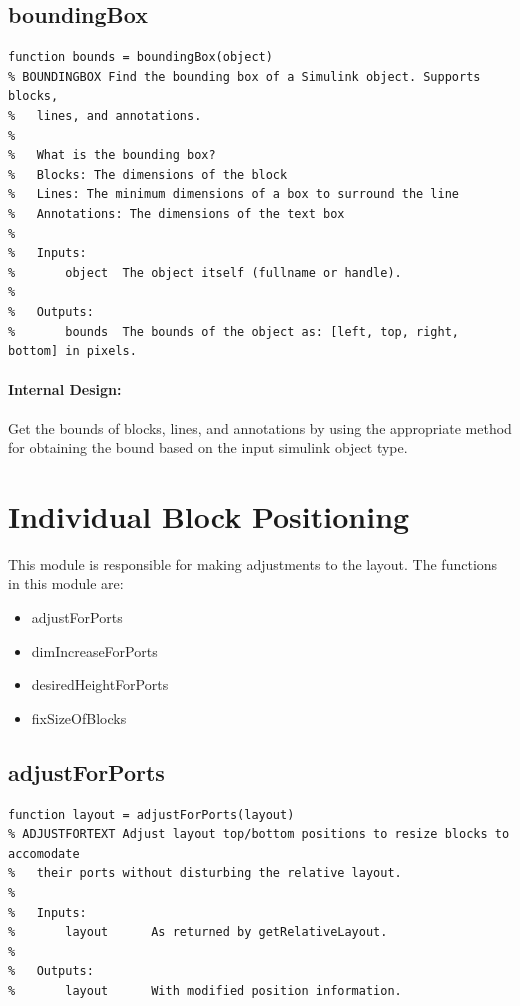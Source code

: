 \documentclass[12pt,letterpaper]{report}
\begin{document}

\subsection{boundingBox} \label{boundingBox}
\begin{lstlisting}
function bounds = boundingBox(object)
% BOUNDINGBOX Find the bounding box of a Simulink object. Supports blocks,
%   lines, and annotations.
%
%   What is the bounding box?
%   Blocks: The dimensions of the block
%   Lines: The minimum dimensions of a box to surround the line
%   Annotations: The dimensions of the text box
%
%   Inputs:
%       object  The object itself (fullname or handle).
%
%   Outputs:
%       bounds  The bounds of the object as: [left, top, right, bottom] in pixels.
\end{lstlisting}
\paragraph{Internal Design:} Get the bounds of blocks, lines, and annotations by using the appropriate method for obtaining the bound based on the input simulink object type.

\section{Individual Block Positioning}
\par This module is responsible for making adjustments to the layout. The functions in this module are:
\begin{itemize}
	\item adjustForPorts
	\item dimIncreaseForPorts
	\item desiredHeightForPorts
	\item fixSizeOfBlocks
\end{itemize}

\subsection{adjustForPorts} \label{adjustForPorts}
\begin{lstlisting}
function layout = adjustForPorts(layout)
% ADJUSTFORTEXT Adjust layout top/bottom positions to resize blocks to accomodate
%   their ports without disturbing the relative layout.
%
%   Inputs:
%       layout      As returned by getRelativeLayout.
%
%   Outputs:
%       layout      With modified position information.
\end{lstlisting}
\end{document}
